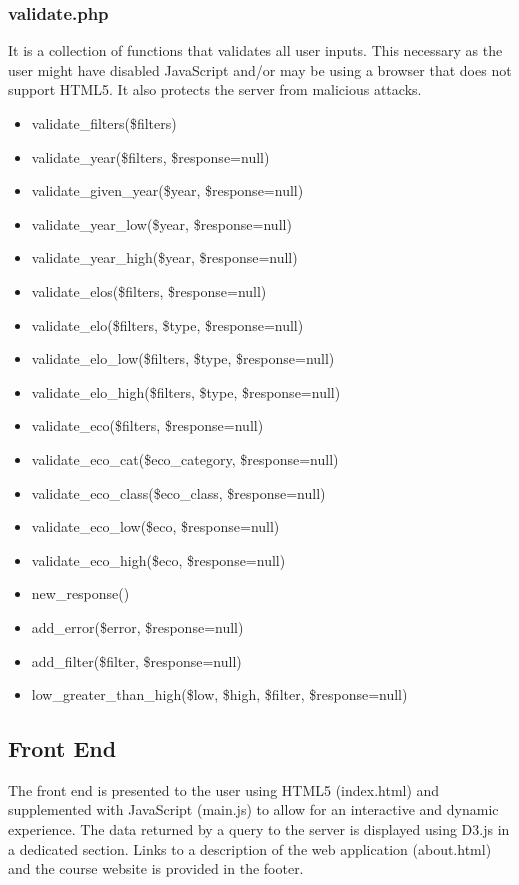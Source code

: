 \documentclass{article}
\begin{document}
\subsubsection{validate.php}
It is a collection of functions that validates all user inputs. This necessary
as the user might have disabled JavaScript and/or may be using a browser that
does not support HTML5. It also protects the server from malicious attacks.
\begin{itemize}
	\item validate\_filters(\$filters)
	\item validate\_year(\$filters, \$response=null)
	\item validate\_given\_year(\$year, \$response=null)
	\item validate\_year\_low(\$year, \$response=null)
	\item validate\_year\_high(\$year, \$response=null)
	\item validate\_elos(\$filters, \$response=null)
	\item validate\_elo(\$filters, \$type, \$response=null)
	\item validate\_elo\_low(\$filters, \$type, \$response=null)
	\item validate\_elo\_high(\$filters, \$type, \$response=null)
	\item validate\_eco(\$filters, \$response=null)
	\item validate\_eco\_cat(\$eco\_category, \$response=null)
	\item validate\_eco\_class(\$eco\_class, \$response=null)
	\item validate\_eco\_low(\$eco, \$response=null)
	\item validate\_eco\_high(\$eco, \$response=null)
	\item new\_response()
	\item add\_error(\$error, \$response=null)
	\item add\_filter(\$filter, \$response=null)
	\item low\_greater\_than\_high(\$low, \$high, \$filter, \$response=null)
\end{itemize}

\subsection{Front End}
The front end is presented to the user using HTML5 (index.html) and
supplemented with JavaScript (main.js) to allow for an interactive and
dynamic experience.  The data returned by a query to the server is
displayed using D3.js in a dedicated section.  Links to a description
of the web application (about.html) and the course
website is provided in the footer.
\end{document}
